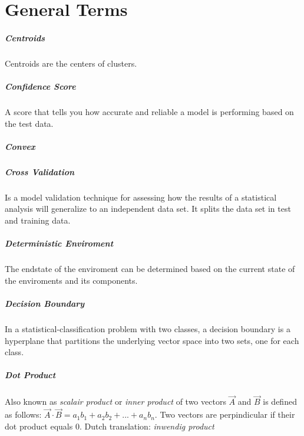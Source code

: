 \chapter{General Terms}\label{chap:general_terms}

\paragraph{Centroids}
Centroids are the centers of clusters.

\paragraph{Confidence Score} 
A score that tells you how accurate and reliable a model is performing based on the test data.

\paragraph{Convex}

\paragraph{Cross Validation} 
Is a model validation technique for assessing how the results of a statistical analysis will generalize to an independent data set. It splits the data set in test and training data.

\paragraph{Deterministic Enviroment}
The endstate of the enviroment can be determined based on the current state of the enviroments and its components.

\paragraph{Decision Boundary}
In a statistical-classification problem with two classes, a decision boundary is a hyperplane that partitions the underlying vector space into two sets, one for each class.

\paragraph{Dot Product}
Also known as \emph{scalair product} or \emph{inner product} of two vectors $\vec{A}$ and $\vec{B}$ is defined as follows: $\vec{A} \cdot \vec{B} = a_1 b_1 + a_2 b_2 + ... + a_n b_n$. Two vectors are perpindicular if their dot product equals 0. Dutch translation: \emph{inwendig product}

